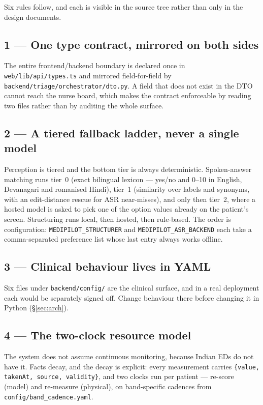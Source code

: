 \documentclass[10pt,a4paper,twocolumn]{article}
\newcommand{\pth}[1]{\textcolor{SecPurple}{\texttt{#1}}}
\newcommand{\cm}[1]{\texttt{#1}}
\begin{document}
Six rules follow, and each is visible in the source tree rather than only in the design documents.

\subsection{1 --- One type contract, mirrored on both sides}
The entire frontend/backend boundary is declared once in \pth{web/lib/api/types.ts} and mirrored
field-for-field by \pth{backend/triage/orchestrator/dto.py}. A field that does not exist in the
DTO cannot reach the nurse board, which makes the contract enforceable by reading two files rather
than by auditing the whole surface.

\subsection{2 --- A tiered fallback ladder, never a single model}
Perception is tiered and the bottom tier is always deterministic. Spoken-answer matching runs
tier~0 (exact bilingual lexicon --- yes/no and 0--10 in English, Devanagari and romanised Hindi),
tier~1 (similarity over labels and synonyms, with an edit-distance rescue for ASR near-misses),
and only then tier~2, where a hosted model is asked to pick one of the option values already on
the patient's screen. Structuring runs local, then hosted, then rule-based. The order is
configuration: \cm{MEDIPILOT\_STRUCTURER} and \cm{MEDIPILOT\_ASR\_BACKEND} each take a
comma-separated preference list whose last entry always works offline.

\subsection{3 --- Clinical behaviour lives in YAML}
Six files under \pth{backend/config/} are the clinical surface, and in a real deployment each
would be separately signed off. Change behaviour there before changing it in Python
(\S\ref{sec:arch}).

\subsection{4 --- The two-clock resource model}
The system does not assume continuous monitoring, because Indian EDs do not have it. Facts decay,
and the decay is explicit: every measurement carries \cm{\{value, takenAt, source, validity\}},
and two clocks run per patient --- re-score (model) and re-measure (physical), on band-specific
cadences from \pth{config/band\_cadence.yaml}.
\end{document}
